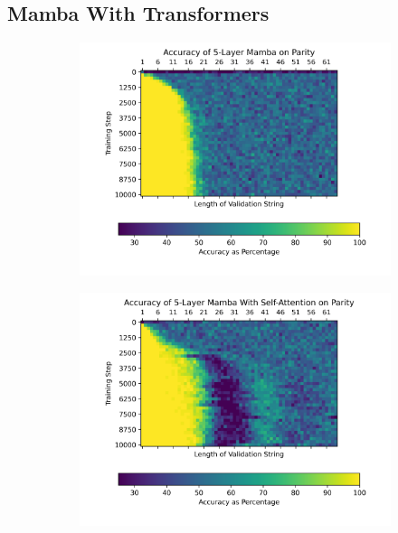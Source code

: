\subsection{Mamba With Transformers}
\begin{figure}[ht]
    \begin{subfigure}{0.5\textwidth}
        \includegraphics[width=\textwidth]{figures/mamba_no_self_attention.png}
        \caption{}
        \label{mambanoselfattention}
    \end{subfigure}\begin{subfigure}{0.5\textwidth}
        \includegraphics[width=\textwidth]{figures/mamba_self_attention.png}
        \caption{}
        \label{mambaselfattention}
    \end{subfigure}
    \caption{}
    \label{mambaattentiontest}
\end{figure}

